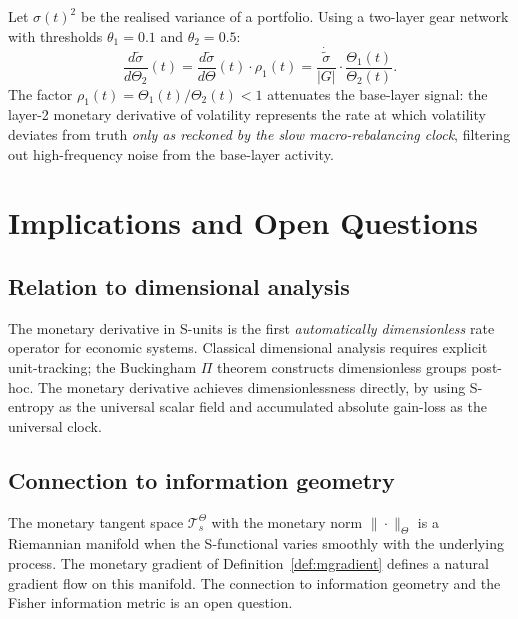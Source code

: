 \documentclass[twocolumn,11pt,a4paper]{article}
\theoremstyle{thmstyle}
\theoremstyle{definition}
\theoremstyle{remark}
\newcommand{\Gain}{G}                        %
\newcommand{\Clock}{\Theta}                  %
\newcommand{\Mdiff}[1]{\frac{d#1}{d\Clock}} %
\newcommand{\MdiffK}[2]{\frac{d#1}{d\Clock_{#2}}} %
\newcommand{\Mtan}{\mathcal{T}^{\Clock}}     %
\begin{document}
Let $\sigma(t)^{2}$ be the realised variance of a
portfolio.  Using a two-layer gear network with thresholds
$\theta_{1}=0.1$ and $\theta_{2}=0.5$:
\begin{equation}
  \MdiffK{\tilde{\sigma}}{2}(t)
  = \Mdiff{\tilde{\sigma}}(t) \cdot \rho_{1}(t)
  = \frac{\dot{\tilde\sigma}}{|\Gain|}
    \cdot \frac{\Clock_{1}(t)}{\Clock_{2}(t)}.
\end{equation}
The factor $\rho_{1}(t) = \Clock_{1}(t)/\Clock_{2}(t)<1$
attenuates the base-layer signal: the layer-2 monetary
derivative of volatility represents the rate at which
volatility deviates from truth \emph{only as reckoned by
the slow macro-rebalancing clock}, filtering out
high-frequency noise from the base-layer activity.


\section{Implications and Open Questions}
\label{sec:conclude}

\subsection{Relation to dimensional analysis}

The monetary derivative in S-units is the first
\emph{automatically dimensionless} rate operator for
economic systems.  Classical dimensional analysis
\citep{Bridgman1922} requires explicit unit-tracking;
the Buckingham $\Pi$ theorem \citep{Buckingham1914}
constructs dimensionless groups post-hoc.  The monetary
derivative achieves dimensionlessness directly, by using
S-entropy as the universal scalar field and accumulated
absolute gain-loss as the universal clock.

\subsection{Connection to information geometry}

The monetary tangent space $\Mtan_{s}$ with the monetary
norm $\|\cdot\|_{\Clock}$ is a Riemannian manifold when
the S-functional varies smoothly with the underlying
process.  The monetary gradient of
Definition~\ref{def:mgradient} defines a natural gradient
flow on this manifold.  The connection to information
geometry \citep{AmariFTJ1987} and the Fisher information
metric is an open question.
\end{document}
